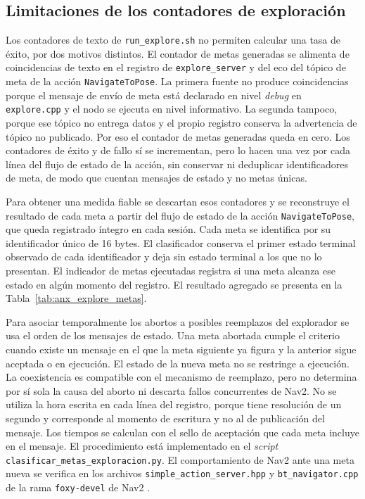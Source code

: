 \begin{appendices}
\subsection{Limitaciones de los contadores de exploración}

Los contadores de texto de \texttt{run\_explore.sh} no permiten calcular una tasa de éxito, por dos motivos distintos. El contador de metas generadas se alimenta de coincidencias de texto en el registro de \texttt{explore\_server} y del eco del tópico de meta de la acción \texttt{NavigateToPose}. La primera fuente no produce coincidencias porque el mensaje de envío de meta está declarado en nivel \textit{debug} en \texttt{explore.cpp} y el nodo se ejecuta en nivel informativo. La segunda tampoco, porque ese tópico no entrega datos y el propio registro conserva la advertencia de tópico no publicado. Por eso el contador de metas generadas queda en cero. Los contadores de éxito y de fallo sí se incrementan, pero lo hacen una vez por cada línea del flujo de estado de la acción, sin conservar ni deduplicar identificadores de meta, de modo que cuentan mensajes de estado y no metas únicas.

Para obtener una medida fiable se descartan esos contadores y se reconstruye el resultado de cada meta a partir del flujo de estado de la acción \texttt{NavigateToPose}, que queda registrado íntegro en cada sesión. Cada meta se identifica por su identificador único de 16 bytes. El clasificador conserva el primer estado terminal observado de cada identificador y deja sin estado terminal a los que no lo presentan. El indicador de metas ejecutadas registra si una meta alcanza ese estado en algún momento del registro. El resultado agregado se presenta en la Tabla~\ref{tab:anx_explore_metas}.

Para asociar temporalmente los abortos a posibles reemplazos del explorador
se usa el orden de los mensajes de estado. Una meta abortada cumple el
criterio cuando existe un mensaje en el que la meta siguiente ya figura y
la anterior sigue aceptada o en ejecución. El estado de la nueva meta no se
restringe a ejecución. La coexistencia es compatible con el mecanismo de
reemplazo, pero no determina por sí sola la causa del aborto ni descarta
fallos concurrentes de Nav2. No se utiliza la hora escrita
en cada línea del registro, porque tiene resolución de un segundo y corresponde
al momento de escritura y no al de publicación del mensaje. Los tiempos se
calculan con el sello de aceptación que cada meta incluye en el mensaje. El
procedimiento está implementado en el \textit{script}
\texttt{clasificar\_metas\_exploracion.py}. El comportamiento de Nav2 ante una
meta nueva se verifica en los archivos \texttt{simple\_action\_server.hpp} y
\texttt{bt\_navigator.cpp} de la rama \texttt{foxy-devel} de Nav2
\citep{nav2_foxy_src}.


\end{appendices}
